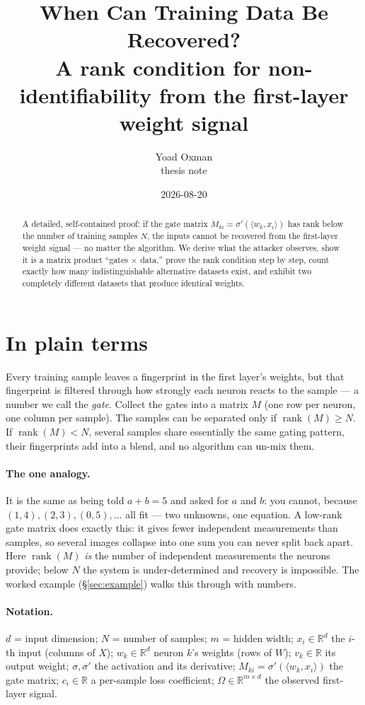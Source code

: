 \documentclass[11pt]{article}
\title{\textbf{When Can Training Data Be Recovered?}\\[2pt]
\large A rank condition for non-identifiability from the first-layer weight signal}
\author{Yoad Oxman \\ \small thesis note}
\date{2026-08-20}
\theoremstyle{definition}
\newcommand{\R}{\mathbb{R}}
\newcommand{\rank}{\operatorname{rank}}
\newcommand{\ip}[2]{\langle #1, #2\rangle}
\newcommand{\Om}{\Omega}
\begin{document}
\maketitle

\begin{abstract}\noindent
A detailed, self-contained proof: if the gate matrix $M_{ki}=\sigma'(\ip{w_k}{x_i})$ has rank
below the number of training samples $N$, the inputs cannot be recovered from the first-layer
weight signal --- no matter the algorithm. We derive what the attacker observes, show it is a
matrix product ``gates $\times$ data,'' prove the rank condition step by step, count exactly how
many indistinguishable alternative datasets exist, and exhibit two completely different datasets
that produce identical weights.
\end{abstract}

\section*{In plain terms}
Every training sample leaves a fingerprint in the first layer's weights, but that fingerprint is
filtered through how strongly each neuron reacts to the sample --- a number we call the
\emph{gate}. Collect the gates into a matrix $M$ (one row per neuron, one column per sample). The
samples can be separated only if $\rank(M)\ge N$. If $\rank(M)<N$, several samples share
essentially the same gating pattern, their fingerprints add into a blend, and no algorithm can
un-mix them.

\paragraph{The one analogy.} It is the same as being told $a+b=5$ and asked for $a$ and $b$: you
cannot, because $(1,4),(2,3),(0,5),\dots$ all fit --- two unknowns, one equation. A low-rank gate
matrix does exactly this: it gives fewer independent measurements than samples, so several images
collapse into one sum you can never split back apart. Here $\rank(M)$ \emph{is} the number of
independent measurements the neurons provide; below $N$ the system is under-determined and recovery
is impossible. The worked example (\S\ref{sec:example}) walks this through with numbers.

\paragraph{Notation.}
$d$ = input dimension; $N$ = number of samples; $m$ = hidden width;
$x_i\in\R^d$ the $i$-th input (columns of $X$); $w_k\in\R^d$ neuron $k$'s weights (rows of $W$);
$v_k\in\R$ its output weight; $\sigma,\sigma'$ the activation and its derivative;
$M_{ki}=\sigma'(\ip{w_k}{x_i})$ the gate matrix; $c_i\in\R$ a per-sample loss coefficient;
$\Om\in\R^{m\times d}$ the observed first-layer signal.
\end{document}
